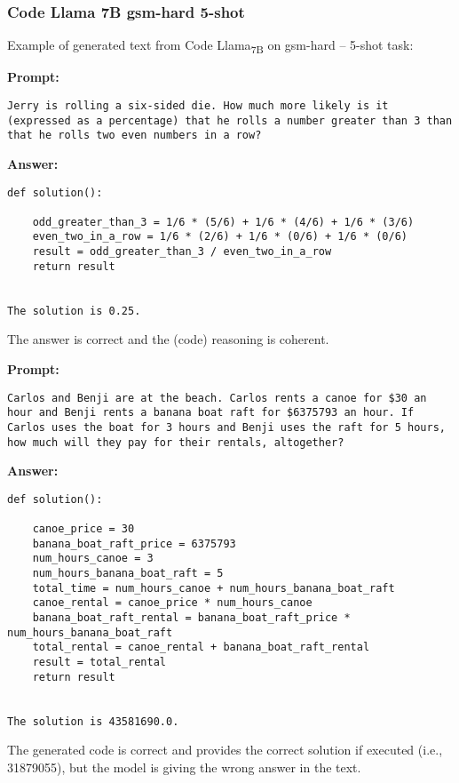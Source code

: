 	\subsubsection*{Code Llama 7B gsm-hard 5-shot}
	\noindent Example of generated text from Code Llama\textsubscript{7B} on gsm-hard -- 5-shot task:
	\begin{displayquote}
		\textbf{Prompt:}
		\begin{Verbatim}[fontsize=\small,breaklines]
Jerry is rolling a six-sided die. How much more likely is it (expressed as a percentage) that he rolls a number greater than 3 than that he rolls two even numbers in a row?
	\end{Verbatim}
		\textbf{Answer:}
		\begin{Verbatim}[fontsize=\small,breaklines]
def solution():

    odd_greater_than_3 = 1/6 * (5/6) + 1/6 * (4/6) + 1/6 * (3/6)
    even_two_in_a_row = 1/6 * (2/6) + 1/6 * (0/6) + 1/6 * (0/6)
    result = odd_greater_than_3 / even_two_in_a_row
    return result


The solution is 0.25.
	\end{Verbatim}
	\end{displayquote}
	The answer is correct and the (code) reasoning is coherent.
	\begin{displayquote}
		\textbf{Prompt:}
		\begin{Verbatim}[fontsize=\small,breaklines]
Carlos and Benji are at the beach. Carlos rents a canoe for $30 an hour and Benji rents a banana boat raft for $6375793 an hour. If Carlos uses the boat for 3 hours and Benji uses the raft for 5 hours, how much will they pay for their rentals, altogether?
	\end{Verbatim}
		\textbf{Answer:}
		\begin{Verbatim}[fontsize=\small,breaklines]
def solution():

    canoe_price = 30
    banana_boat_raft_price = 6375793
    num_hours_canoe = 3
    num_hours_banana_boat_raft = 5
    total_time = num_hours_canoe + num_hours_banana_boat_raft
    canoe_rental = canoe_price * num_hours_canoe
    banana_boat_raft_rental = banana_boat_raft_price * num_hours_banana_boat_raft
    total_rental = canoe_rental + banana_boat_raft_rental
    result = total_rental
    return result


The solution is 43581690.0.
	\end{Verbatim}
	\end{displayquote}
	The generated code is correct and provides the correct solution if executed (i.e., 31879055), but the model is giving the wrong answer in the text.

